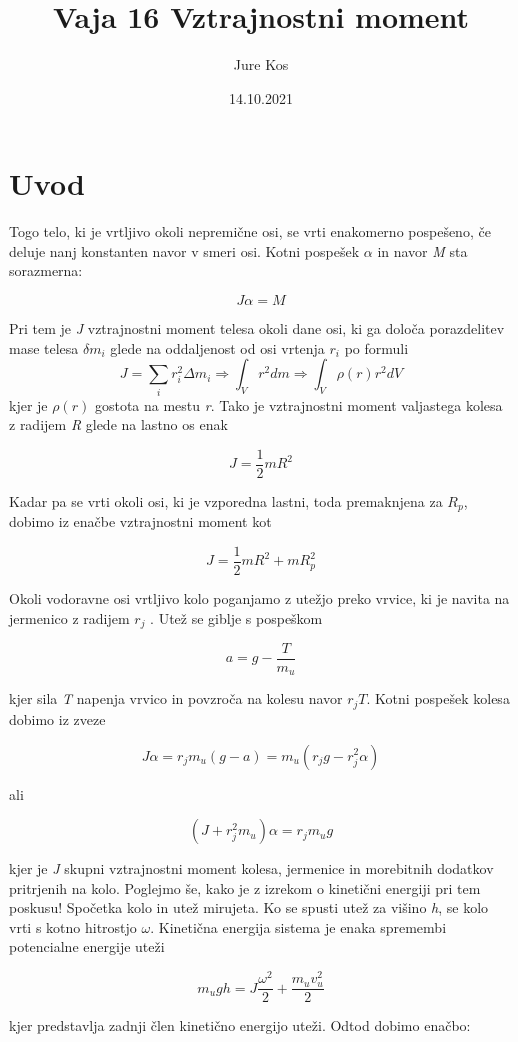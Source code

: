 \documentclass[a4paper]{report}
\title{Vaja 16 Vztrajnostni moment}
\author{Jure Kos}
\date{14.10.2021}
\begin{document}
\maketitle
\chapter*{Uvod}
Togo telo, ki je vrtljivo okoli nepremične osi, se vrti enakomerno pospešeno, če deluje nanj konstanten navor v smeri osi. Kotni pospešek  \textit{$\alpha$} in navor \textit{M} sta sorazmerna:

\[J\alpha=M\]

Pri tem je \textit{J} vztrajnostni moment telesa okoli dane osi, ki ga določa porazdelitev mase telesa \textit{$\delta m_i$} glede na oddaljenost od osi vrtenja \textit{$r_i$} po formuli
\[J=\sum_{i}r_i^2 \Delta m_i \Rightarrow \int_{V} r^2 dm \Rightarrow \int_{V} \rho (r)r^2 dV \]
kjer je \textit{$ \rho (r)$} gostota na mestu \textit{r}. Tako je vztrajnostni moment valjastega kolesa z radijem \textit{R} glede na lastno os enak

\[J=\frac{1}{2}mR^2\]

Kadar pa se vrti okoli osi, ki je vzporedna lastni, toda premaknjena za \textit{$R_p$}, dobimo iz enačbe vztrajnostni moment kot

\[J=\frac{1}{2}mR^2+mR_p^2\]

Okoli vodoravne osi vrtljivo kolo poganjamo z utežjo preko vrvice, ki je navita na jermenico z radijem \textit{$r_j$} . Utež se giblje s pospeškom

\[a=g-\frac{T}{m_u}\]

kjer sila \textit{T} napenja vrvico in povzroča na kolesu navor \textit{$r_j T$}. Kotni pospešek kolesa dobimo iz zveze

\[J\alpha=r_j m_u (g-a)=m_u (r_j g-r_j^2 \alpha)\]

ali

\[(J+r_j^2 m_u)\alpha=r_j m_u g\]

kjer je \textit{J} skupni vztrajnostni moment kolesa, jermenice in morebitnih dodatkov pritrjenih na kolo. Poglejmo še, kako je z izrekom o kinetični energiji pri tem poskusu! Spočetka kolo in utež mirujeta. Ko se spusti utež za višino \textit{h}, se kolo vrti s kotno hitrostjo $\omega$. Kinetična energija sistema je enaka spremembi potencialne energije uteži

\[m_u gh=J\frac{\omega^2}{2}+\frac{m_u v_u^2}{2}\]

kjer predstavlja zadnji člen kinetično energijo uteži. Odtod dobimo enačbo:
\end{document}
